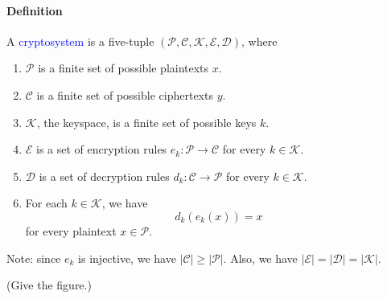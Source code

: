 \documentclass[a4paper, 11pt, openany]{book}
\numberwithin{equation}{section}
\theoremstyle{plain}
\theoremstyle{definition}
\newcommand{\Structure}[1]{\textcolor{blue}{#1}}
\newcommand{\Define}[1]{\textcolor{purple}{#1}}
\newcommand{\alphabet}[1]{\mathcal{#1}}
\begin{document}
\paragraph{Definition}
A \Structure{cryptosystem} is a five-tuple $(\alphabet{P}, \alphabet{C}, \alphabet{K}, \alphabet{E}, \alphabet{D} )$, where
\begin{enumerate}
	\item $\alphabet{P}$ is a finite set of possible plaintexts $x$.
	
	\item $\alphabet{C}$ is a finite set of possible ciphertexts $y$.
	
	\item $\alphabet{K}$, the keyspace, is a finite set of possible keys $k$.
	
	\item $\alphabet{E}$ is a set of encryption rules $e_k : \alphabet{P} \to \alphabet{C}$ for every $k \in \alphabet{K}$.
	
	\item $\alphabet{D}$ is a set of decryption rules $d_k : \alphabet{C} \to \alphabet{P}$ for every $k \in \alphabet{K}$.
	
	\item For each $k \in \alphabet{K}$, we have
	\[
		d_k( e_k(x) ) = x 
	\]
	for every plaintext $x \in \alphabet{P}$.
\end{enumerate}

Note: since $e_k$ is injective, we have $|\alphabet{C}| \ge |\alphabet{P}|$. Also, we have $|\alphabet{E}| = |\alphabet{D}| = |\alphabet{K}|$.





(Give the figure.)







\end{document}
